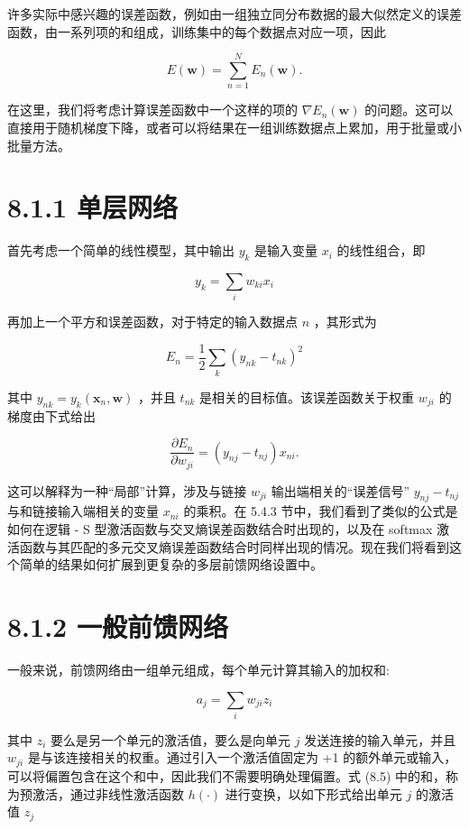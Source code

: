 \documentclass[10pt]{report}
\begin{document}
许多实际中感兴趣的误差函数，例如由一组独立同分布数据的最大似然定义的误差函数，由一系列项的和组成，训练集中的每个数据点对应一项，因此

\[
E\left( \mathbf{w}\right)  = \mathop{\sum }\limits_{{n = 1}}^{N}{E}_{n}\left( \mathbf{w}\right) . \tag{8.1}
\]

在这里，我们将考虑计算误差函数中一个这样的项的 \(\nabla {E}_{n}\left( \mathbf{w}\right)\) 的问题。这可以直接用于随机梯度下降，或者可以将结果在一组训练数据点上累加，用于批量或小批量方法。

\section*{8.1.1 单层网络}

首先考虑一个简单的线性模型，其中输出 \({y}_{k}\) 是输入变量 \({x}_{i}\) 的线性组合，即

\[
{y}_{k} = \mathop{\sum }\limits_{i}{w}_{ki}{x}_{i} \tag{8.2}
\]

再加上一个平方和误差函数，对于特定的输入数据点 \(n\) ，其形式为

\[
{E}_{n} = \frac{1}{2}\mathop{\sum }\limits_{k}{\left( {y}_{nk} - {t}_{nk}\right) }^{2} \tag{8.3}
\]

其中 \({y}_{nk} = {y}_{k}\left( {{\mathbf{x}}_{n},\mathbf{w}}\right)\) ，并且 \({t}_{nk}\) 是相关的目标值。该误差函数关于权重 \({w}_{ji}\) 的梯度由下式给出

\[
\frac{\partial {E}_{n}}{\partial {w}_{ji}} = \left( {{y}_{nj} - {t}_{nj}}\right) {x}_{ni}. \tag{8.4}
\]

这可以解释为一种“局部”计算，涉及与链接 \({w}_{ji}\) 输出端相关的“误差信号” \({y}_{nj} - {t}_{nj}\) 与和链接输入端相关的变量 \({x}_{ni}\) 的乘积。在 5.4.3 节中，我们看到了类似的公式是如何在逻辑 - S 型激活函数与交叉熵误差函数结合时出现的，以及在 softmax 激活函数与其匹配的多元交叉熵误差函数结合时同样出现的情况。现在我们将看到这个简单的结果如何扩展到更复杂的多层前馈网络设置中。

\section*{8.1.2 一般前馈网络}

一般来说，前馈网络由一组单元组成，每个单元计算其输入的加权和:

\[
{a}_{j} = \mathop{\sum }\limits_{i}{w}_{ji}{z}_{i} \tag{8.5}
\]

其中 \({z}_{i}\) 要么是另一个单元的激活值，要么是向单元 \(j\) 发送连接的输入单元，并且 \({w}_{ji}\) 是与该连接相关的权重。通过引入一个激活值固定为 +1 的额外单元或输入，可以将偏置包含在这个和中，因此我们不需要明确处理偏置。式 (8.5) 中的和，称为预激活，通过非线性激活函数 \(h\left( \cdot \right)\) 进行变换，以如下形式给出单元 \(j\) 的激活值 \({z}_{j}\)
\end{document}
